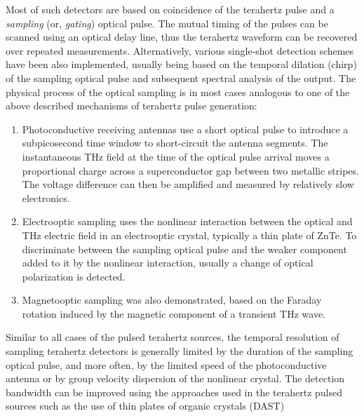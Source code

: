 Most of such detectors are based on coincidence of the terahertz pulse and a \textit{sampling} (or, \textit{gating}) optical pulse. The mutual timing of the pulses can be scanned using an optical delay line, thus the terahertz waveform can be recovered over repeated measurements.\cite{wu1996ultrafast}  %
Alternatively, various single-shot detection schemes have been also implemented, usually being based on the temporal dilation (chirp) of the sampling optical pulse and subsequent spectral analysis of the output.
The physical process of the optical sampling is in most cases analogous to one of the above described mechanisms of terahertz pulse generation:
\begin{enumerate}
 \item{Photoconductive receiving antennas use a short optical pulse to introduce a subpicosecond time window to short-circuit the antenna segments. The instantaneous THz field at the time of the optical pulse arrival moves a proportional charge across a superconductor gap between two metallic stripes. The voltage difference can then be amplified and measured by relatively slow electronics.} 
 \item{Electrooptic sampling uses the nonlinear interaction between the optical and THz electric field in an electrooptic crystal, typically a thin plate of ZnTe. To discriminate between the sampling optical pulse and the weaker component added to it by the nonlinear interaction, usually a change of optical polarization is detected.}  %
 \item{Magnetooptic sampling was also demonstrated,\cite{riordan1997free} based on the Faraday rotation induced by the magnetic component of a transient THz wave.} %
 \end{enumerate}
Similar to all cases of the pulsed terahertz sources, the temporal resolution of sampling terahertz detectors is generally limited by the duration of the sampling optical pulse, and more often, by the limited speed of the photoconductive antenna or by group velocity dispersion of the nonlinear crystal. The detection bandwidth can be improved using the approaches used in the terahertz pulsed sources  such as the use of thin plates of organic crystals (DAST) %
